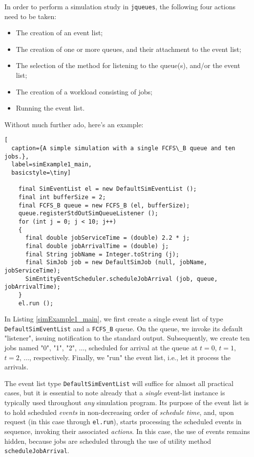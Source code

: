 \documentclass[12pt]{book}
\begin{document}
In order to perform a simulation study in \lstinline|jqueues|,
  the following four actions need to be taken:
\begin{itemize}
\item The creation of an event list;
\item The creation of one or more queues, and their attachment to the event list;
\item The selection of the method for listening to the queue(s), and/or the event list;
\item The creation of a workload consisting of jobs;
\item Running the event list.
\end{itemize}
Without much further ado, here's an example:

\begin{lstlisting}[
  caption={A simple simulation with a single FCFS\_B queue and ten jobs.},
  label=simExample1_main,
  basicstyle=\tiny]

    final SimEventList el = new DefaultSimEventList ();
    final int bufferSize = 2;
    final FCFS_B queue = new FCFS_B (el, bufferSize);
    queue.registerStdOutSimQueueListener ();
    for (int j = 0; j < 10; j++)
    {
      final double jobServiceTime = (double) 2.2 * j;
      final double jobArrivalTime = (double) j;
      final String jobName = Integer.toString (j);
      final SimJob job = new DefaultSimJob (null, jobName, jobServiceTime);
      SimEntityEventScheduler.scheduleJobArrival (job, queue, jobArrivalTime);
    }
    el.run ();

\end{lstlisting}

In Listing \ref{simExample1_main},
  we first create a single event list of type \lstinline|DefaultSimEventList|
  and a \lstinline|FCFS_B| queue.
On the queue, we invoke its default "listener",
  issuing notification to the standard output.
Subsequently,
  we create ten jobs named "0", "1", "2", $\ldots$,
  scheduled for arrival at the queue
  at $t=0$, $t=1$, $t=2$, $\ldots$,
  respectively.
Finally, we "run" the event list, i.e.,
  let it process the arrivals.

The event list type
  \lstinline|DefaultSimEventList|
  will suffice for almost all practical cases,
  but it is essential to note already that
  a {\em single\/} event-list instance is typically used
  throughout {\em any\/} simulation program.
Its purpose of the event list is to hold scheduled {\em events\/}
  in non-decreasing order of {\em schedule time},
  and, upon request (in this case through \lstinline|el.run|),
  starts processing the scheduled events in sequence,
  invoking their associated {\em actions}.
In this case,
  the use of events remains hidden,
  because jobs are scheduled through the use of utility method
  \lstinline|scheduleJobArrival|.
\end{document}
